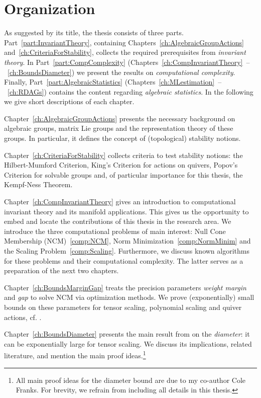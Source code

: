 \section*{Organization}

As suggested by its title, the thesis consists of three parts. Part~\ref{part:InvariantTheory}, containing Chapters~\ref{ch:AlgebraicGroupActions} and~\ref{ch:CriteriaForStability},  collects the required prerequisites from \emph{invariant theory}. In Part~\ref{part:CompComplexity} (Chapters~\ref{ch:CompInvariantTheory}~--~\ref{ch:BoundsDiameter}) we present the results on \emph{computational complexity}. Finally, Part~\ref{part:AlgebraicStatistics} (Chapters~\ref{ch:MLestimation}~--~\ref{ch:RDAGs}) contains the content regarding \emph{algebraic statistics}. In the following we give short descriptions of each chapter.

\bigskip

Chapter~\ref{ch:AlgebraicGroupActions} presents the necessary background on algebraic groups, matrix Lie groups and the representation theory of these groups. In particular, it defines the concept of (topological) stability notions.

Chapter~\ref{ch:CriteriaForStability} collects criteria to test stability notions: the Hilbert-Mumford Criterion, King's Criterion for actions on quivers, Popov's Criterion for solvable groups and, of particular importance for this thesis, the Kempf-Ness Theorem.

\bigskip

Chapter~\ref{ch:CompInvariantTheory} gives an introduction to computational invariant theory and its manifold applications. This gives us the opportunity to embed and locate the contributions of this thesis in the research area. We introduce the three computational problems of main interest: Null Cone Membership (NCM)~\ref{comp:NCM}, Norm Minimization~\ref{comp:NormMinim} and the Scaling Problem~\ref{comp:Scaling}. Furthermore, we discuss known algorithms for these problems and their computational complexity. The latter serves as a preparation of the next two chapters.

Chapter~\ref{ch:BoundsMarginGap} treats the precision parameters \emph{weight margin} and \emph{gap} to solve NCM via optimization methods. We prove (exponentially) small bounds on these parameters for tensor scaling, polynomial scaling and quiver actions, cf. \cite{WeightMargin}.

Chapter~\ref{ch:BoundsDiameter} presents the main result from \cite{WeightMargin} on the \emph{diameter}: it can be exponentially large for tensor scaling. We discuss its implications, related literature, and mention the main proof ideas.\footnote{All main proof ideas for the diameter bound are due to my co-author Cole Franks. For brevity, we refrain from including all details in this thesis.}


